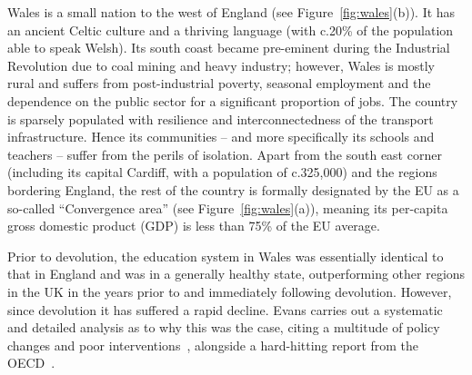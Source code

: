 \documentclass{sig-alternate}
\begin{document}
Wales is a small nation to the west of England (see
Figure~\ref{fig:wales}(b)).  It has an ancient Celtic culture and a
thriving language (with c.20\% of the population able to speak Welsh).
Its south coast became pre-eminent during the Industrial Revolution
due to coal mining and heavy industry; however, Wales is mostly rural
and suffers from post-industrial poverty, seasonal employment and the
dependence on the public sector for a significant proportion of
jobs. The country is sparsely populated with resilience and
interconnectedness of the transport infrastructure.  Hence its
communities -- and more specifically its schools and teachers --
suffer from the perils of isolation. Apart from the south east corner
(including its capital Cardiff, with a population of c.325,000) and
the regions bordering England, the rest of the country is formally
designated by the EU as a so-called ``Convergence area'' (see
Figure~\ref{fig:wales}(a)), meaning its per-capita gross domestic
product (GDP) is less than 75\% of the EU average.

Prior to devolution, the education system in Wales was essentially
identical to that in England and was in a generally healthy state,
outperforming other regions in the UK in the years prior to and
immediately following devolution.  However, since devolution it has
suffered a rapid decline.  Evans carries out a systematic and detailed
analysis as to why this was the case, citing a multitude of policy
changes and poor interventions~\cite{Evans:2015}, alongside a
hard-hitting report from the OECD~\cite{oecdwales:2014}.
\end{document}
